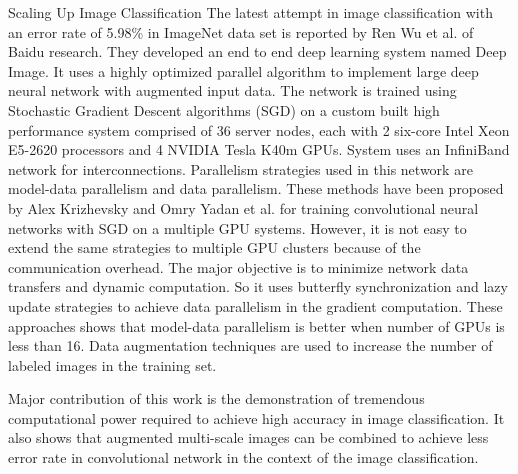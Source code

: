 \documentclass{llncs}
\begin{document}
\begin{subsection}{Scaling Up Image Classification}
The latest attempt in image classification with an error rate of 5.98\% in ImageNet data set is reported by Ren Wu et al. \cite{Wu2015} of Baidu research. They developed an end to end deep learning  system named Deep Image. It uses a highly optimized parallel algorithm to implement large deep neural network with augmented input data. The network is trained using Stochastic Gradient Descent algorithms (SGD) on a custom built high performance system comprised of 36 server nodes, each with 2 six-core Intel Xeon E5-2620 processors and 4 NVIDIA Tesla K40m GPUs. System  uses an InfiniBand  network for interconnections. Parallelism strategies used in this network are model-data parallelism and data parallelism. These methods have been proposed by Alex Krizhevsky \cite{Krizhevsky2014} and Omry Yadan et al. \cite{Yadan2013} for training convolutional neural networks with SGD on a  multiple GPU systems. However, it is not easy to extend the same strategies to multiple GPU clusters because of the communication overhead. The major objective is to minimize network data transfers and dynamic computation. So it uses butterfly synchronization and lazy update strategies to achieve data parallelism in the gradient computation. These approaches shows that model-data parallelism is better when number of GPUs is less than 16. %
Data augmentation techniques are used to increase the number of labeled images in the training set. 

\par
 Major contribution of this work is the demonstration of tremendous computational power required to  achieve high accuracy in image classification.
It also shows that augmented multi-scale images can be combined to achieve less error rate in convolutional network in the context of the image classification. 
 \end{subsection}
\vspace*{-3mm}
\end{document}

